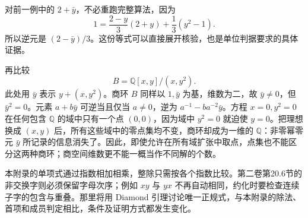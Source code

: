 对前一例中的 \(2+\bar y\)，不必重跑完整算法，因为
\[
	1=\frac{2-y}{3}(2+y)+\frac13(y^2-1).
\]
所以逆元是 \((2-\bar y)/3\)。这份等式可以直接展开核验，也是单位判据要求的具体证据。

\ProseParagraphBreak
再比较
\[
	B=\mathbb Q[x,y]/(x,y^2).
\]
此处用 \(\bar y\) 表示 \(y+(x,y^2)\)。商环 \(B\) 同样以 \(1,\bar y\) 为基，维数为二，故 \(\bar y\ne0\)，但 \(\bar y^2=0\)。元素 \(a+b\bar y\) 可逆当且仅当 \(a\ne0\)，逆为 \(a^{-1}-ba^{-2}\bar y\)。方程 \(x=0,y^2=0\) 在任何包含 \(\mathbb Q\) 的域中只有一个点 \((0,0)\)，因为域中 \(y^2=0\) 就迫使 \(y=0\)。把理想换成 \((x,y)\) 后，所有这些域中的零点集均不变，商环却成为一维的 \(\mathbb Q\)：非零幂零元 \(\bar y\) 所记录的信息消失了。因此，即使允许在所有域扩张中取点，点集也不能区分这两种商环；商空间维数更不能一概当作不同解的个数。

\ProseParagraphBreak
本附录的单项式通过指数相加相乘，整除只需按各个指数比较。第二卷第20.6节的非交换字则必须保留字母次序；例如 \(xy\) 与 \(yx\) 不再自动相同，约化时要检查连续子字的包含与重叠。那里将用 Diamond 引理讨论唯一正规式，与本附录的除法、首项和成员判定相比，条件及证明方式都发生变化。
